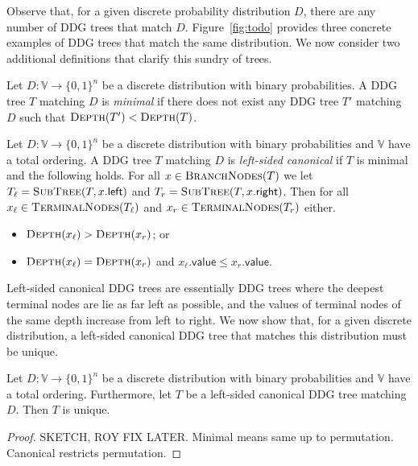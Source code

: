 Observe that, for a given discrete probability distribution $D$, there are any number of DDG trees that match $D$.
Figure~\ref{fig:todo} provides three concrete examples of DDG trees that match the same distribution.
We now consider two additional definitions that clarify this sundry of trees.

\begin{definition} \label{def:min-ddg-tree}
Let $D:\mathbb{V} \to \{0, 1\}^n$ be a discrete distribution with binary probabilities. A DDG tree $T$ matching $D$ is \emph{minimal} if there does not exist any DDG tree $T'$ matching $D$ such that $\textsc{Depth}(T') < \textsc{Depth}(T)$.
\end{definition}

\begin{definition} \label{def:canon-ddg-tree}
Let $D:\mathbb{V} \to \{0, 1\}^n$ be a discrete distribution with binary probabilities and $\mathbb{V}$ have a total ordering. 
A DDG tree $T$ matching $D$ is \emph{left-sided canonical} if $T$ is minimal and the following holds. 
For all $x \in \textsc{BranchNodes}(T)$ we let $T_\ell = \textsc{SubTree}(T, x.\mathsf{left})$ and $T_r = \textsc{SubTree}(T, x.\mathsf{right})$. 
Then for all $x_\ell \in \textsc{TerminalNodes}(T_\ell)$ and $x_r \in \textsc{TerminalNodes}(T_r)$ either.
\begin{itemize}
	\item $\textsc{Depth}(x_\ell) > \textsc{Depth}(x_r)$; or
	\item $\textsc{Depth}(x_\ell) = \textsc{Depth}(x_r)$ and $x_\ell.\mathsf{value} \le x_r.\mathsf{value}$.
\end{itemize}
\end{definition}

Left-sided canonical DDG trees are essentially DDG trees where the deepest terminal nodes are lie as far left as possible, and the values of terminal nodes of the same depth increase from left to right.
We now show that, for a given discrete distribution, a left-sided canonical DDG tree that matches this distribution must be unique.

\begin{theorem} \label{thm:uniqueness-of-canon-ddg-trees}
Let $D:\mathbb{V} \to \{0, 1\}^n$ be a discrete distribution with binary probabilities and $\mathbb{V}$ have a total ordering. 
Furthermore, let $T$ be a left-sided canonical DDG tree matching $D$.
Then $T$ is unique.
\end{theorem}

\begin{proof}
SKETCH, ROY FIX LATER. Minimal means same up to permutation. Canonical restricts permutation.
\end{proof}